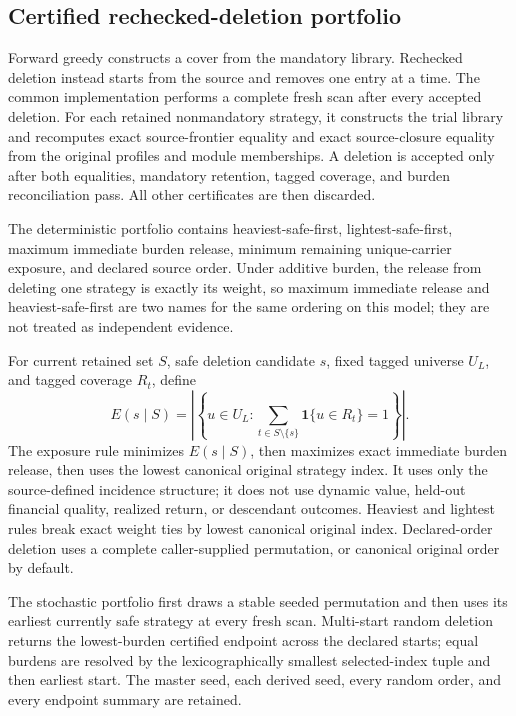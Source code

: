 \subsection{Certified rechecked-deletion portfolio}
\label{subsec:aor-certified-deletion-suite}

Forward greedy constructs a cover from the mandatory library.  Rechecked
deletion instead starts from the source and removes one entry at a time.  The
common implementation performs a complete fresh scan after every accepted
deletion.  For each retained nonmandatory strategy, it constructs the trial
library and recomputes exact source-frontier equality and exact source-closure
equality from the original profiles and module memberships.  A deletion is
accepted only after both equalities, mandatory retention, tagged coverage,
and burden reconciliation pass.  All other certificates are then discarded.

The deterministic portfolio contains heaviest-safe-first,
lightest-safe-first, maximum immediate burden release, minimum remaining
unique-carrier exposure, and declared source order.  Under additive burden,
the release from deleting one strategy is exactly its weight, so maximum
immediate release and heaviest-safe-first are two names for the same ordering
on this model; they are not treated as independent evidence.

For current retained set $S$, safe deletion candidate $s$, fixed tagged
universe $U_L$, and tagged coverage $R_t$, define
\[
 E(s\mid S)
 =\left|\left\{u\in U_L:
   \sum_{t\in S\setminus\{s\}}\mathbf 1\{u\in R_t\}=1
 \right\}\right|.
\]
The exposure rule minimizes $E(s\mid S)$, then maximizes exact immediate
burden release, then uses the lowest canonical original strategy index.  It
uses only the source-defined incidence structure; it does not use dynamic
value, held-out financial quality, realized return, or descendant outcomes.
Heaviest and lightest rules break exact weight ties by lowest canonical
original index.  Declared-order deletion uses a complete caller-supplied
permutation, or canonical original order by default.

The stochastic portfolio first draws a stable seeded permutation and then
uses its earliest currently safe strategy at every fresh scan.  Multi-start
random deletion returns the lowest-burden certified endpoint across the
declared starts; equal burdens are resolved by the lexicographically smallest
selected-index tuple and then earliest start.  The master seed, each derived
seed, every random order, and every endpoint summary are retained.

